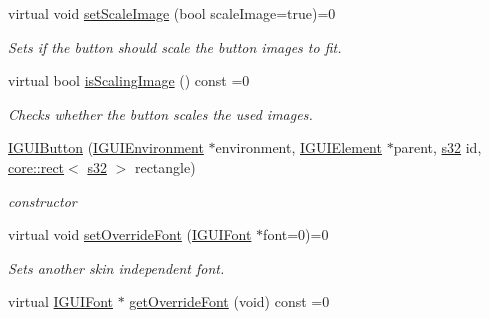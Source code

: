 \begin{DoxyCompactItemize}
\mbox{\label{classirr_1_1gui_1_1IGUIButton_ae0767cb927c7974e19eaa3e5ca52bf1f}} 
virtual void \hyperlink{classirr_1_1gui_1_1IGUIButton_ae0767cb927c7974e19eaa3e5ca52bf1f}{set\+Scale\+Image} (bool scale\+Image=true)=0
\begin{DoxyCompactList}\small\item\em Sets if the button should scale the button images to fit. \end{DoxyCompactList}\item 
\mbox{\label{classirr_1_1gui_1_1IGUIButton_af2660457dae6def0b34d4748e96c653a}} 
virtual bool \hyperlink{classirr_1_1gui_1_1IGUIButton_af2660457dae6def0b34d4748e96c653a}{is\+Scaling\+Image} () const =0
\begin{DoxyCompactList}\small\item\em Checks whether the button scales the used images. \end{DoxyCompactList}\item 
\mbox{\label{classirr_1_1gui_1_1IGUIButton_a9ce8f3172c2c82269c2cf6a650ccaaa8}} 
\hyperlink{classirr_1_1gui_1_1IGUIButton_a9ce8f3172c2c82269c2cf6a650ccaaa8}{I\+G\+U\+I\+Button} (\hyperlink{classirr_1_1gui_1_1IGUIEnvironment}{I\+G\+U\+I\+Environment} $\ast$environment, \hyperlink{classirr_1_1gui_1_1IGUIElement}{I\+G\+U\+I\+Element} $\ast$parent, \hyperlink{namespaceirr_ac66849b7a6ed16e30ebede579f9b47c6}{s32} id, \hyperlink{classirr_1_1core_1_1rect}{core\+::rect}$<$ \hyperlink{namespaceirr_ac66849b7a6ed16e30ebede579f9b47c6}{s32} $>$ rectangle)
\begin{DoxyCompactList}\small\item\em constructor \end{DoxyCompactList}\item 
virtual void \hyperlink{classirr_1_1gui_1_1IGUIButton_ab63c3536bd2eb92e9ebec8ea3a381ec1}{set\+Override\+Font} (\hyperlink{classirr_1_1gui_1_1IGUIFont}{I\+G\+U\+I\+Font} $\ast$font=0)=0
\begin{DoxyCompactList}\small\item\em Sets another skin independent font. \end{DoxyCompactList}\item 
virtual \hyperlink{classirr_1_1gui_1_1IGUIFont}{I\+G\+U\+I\+Font} $\ast$ \hyperlink{classirr_1_1gui_1_1IGUIButton_adbc27c7589bf22d2a7fa676401358578}{get\+Override\+Font} (void) const =0

\end{DoxyCompactItemize}
